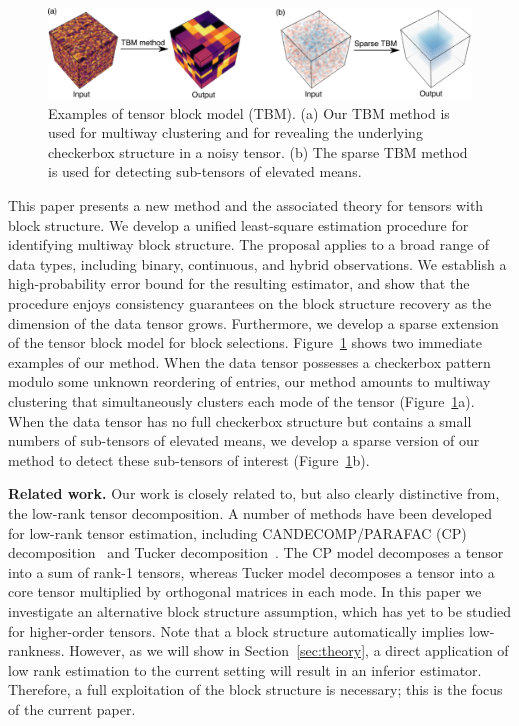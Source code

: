\documentclass{article}
\begin{document}
\begin{figure}[h!]
\vspace{-.2cm}
\centering
\includegraphics[width=.8\textwidth]{figures/demo.pdf}
\caption{\small Examples of tensor block model (TBM). (a) Our TBM method is used for multiway clustering and for revealing the underlying checkerbox structure in a noisy tensor. (b) The sparse TBM method is used for detecting sub-tensors of elevated means. }
\label{fig:1}
\vspace{-.2cm}
\end{figure}

This paper presents a new method and the associated theory for tensors with block structure. We develop a unified least-square estimation procedure for identifying multiway block structure. The proposal applies to a broad range of data types, including binary, continuous, and hybrid observations. We establish a high-probability error bound for the resulting estimator, and show that the procedure enjoys consistency guarantees on the block structure recovery as the dimension of the data tensor grows. Furthermore, we develop a sparse extension of the tensor block model for block selections. Figure~\ref{fig:1} shows two immediate examples of our method. When the data tensor possesses a checkerbox pattern modulo some unknown reordering of entries, our method amounts to multiway clustering that simultaneously clusters each mode of the tensor (Figure~\ref{fig:1}a). When the data tensor has no full checkerbox structure but contains a small numbers of sub-tensors of elevated means, we develop a sparse version of our method to detect these sub-tensors of interest (Figure~\ref{fig:1}b). 

{\bf Related work.} Our work is closely related to, but also clearly distinctive from, the low-rank tensor decomposition. A number of methods have been developed for low-rank tensor estimation, including CANDECOMP/PARAFAC (CP) decomposition~\cite{hitchcock1927expression} and Tucker decomposition~\cite{tucker1966some}. The CP model decomposes a tensor into a sum of rank-1 tensors, whereas Tucker model decomposes a tensor into a core tensor multiplied by orthogonal matrices in each mode. In this paper we investigate an alternative block structure assumption, which has yet to be studied for higher-order tensors. Note that a block structure automatically implies low-rankness. However, as we will show in Section~\ref{sec:theory}, a direct application of low rank estimation to the current setting will result in an inferior estimator. Therefore, a full exploitation of the block structure is necessary; this is the focus of the current paper. 
\end{document}
